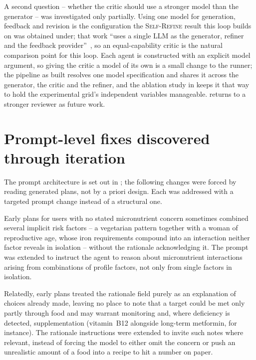 A second question -- whether the critic should use a stronger model than the generator -- was investigated only partially. Using one model for generation, feedback and revision is the configuration the \textsc{Self-Refine} result this loop builds on was obtained under; that work \enquote{uses a single LLM as the generator, refiner and the feedback provider}~\cite{madaan2023selfrefine}, so an equal-capability critic is the natural comparison point for this loop. Each agent is constructed with an explicit model argument, so giving the critic a model of its own is a small change to the runner; the pipeline as built resolves one model specification and shares it across the generator, the critic and the refiner, and the ablation study in  keeps it that way to hold the experimental grid's independent variables manageable.  returns to a stronger reviewer as future work.

\section{Prompt-level fixes discovered through iteration}
\label{sec:impl-prompt-fixes}

The prompt architecture is set out in ; the following changes were forced by reading generated plans, not by a priori design. Each was addressed with a targeted prompt change instead of a structural one.

Early plans for users with no stated micronutrient concern sometimes combined several implicit risk factors -- a vegetarian pattern together with a woman of reproductive age, whose iron requirements compound into an interaction neither factor reveals in isolation -- without the rationale acknowledging it. The prompt was extended to instruct the agent to reason about micronutrient interactions arising from combinations of profile factors, not only from single factors in isolation.

Relatedly, early plans treated the rationale field purely as an explanation of choices already made, leaving no place to note that a target could be met only partly through food and may warrant monitoring and, where deficiency is detected, supplementation (vitamin~B12 alongside long-term metformin, for instance). The rationale instructions were extended to invite such notes where relevant, instead of forcing the model to either omit the concern or push an unrealistic amount of a food into a recipe to hit a number on paper.

